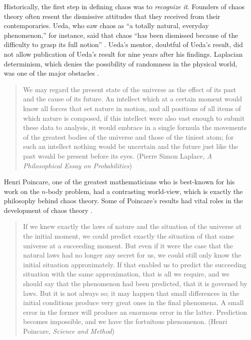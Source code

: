 \documentclass[10pt,twoside,draft]{book}
\begin{document}
Historically, the first step in defining chaos was to \textit{recognize it}.
Founders of chaos theory often resent the dismissive attitudes that they received from their contemporaries.
Ueda, who saw chaos as ``a totally natural, everyday phenomenon,'' for instance, said that chaos ``has been dismissed because of the difficulty to grasp its full notion'' \citep[p.533]{gleick}.
Ueda's mentor, doubtful of Ueda's result, did not allow publication of Ueda's result for nine years after his findings.
Laplacian determinism, which denies the possibility of randomness in the physical world, was one of the major obstacles \citep{stone}.
\begin{quotation}
  We may regard the present state of the universe as the effect of its past and the cause of its future. An intellect which at a certain moment would know all forces that set nature in motion, and all positions of all items of which nature is composed, if this intellect were also vast enough to submit these data to analysis, it would embrace in a single formula the movements of the greatest bodies of the universe and those of the tiniest atom; for such an intellect nothing would be uncertain and the future just like the past would be present before its eyes.
  (Pierre Simon Laplace, \textit{A Philosophical Essay on Probabilities})
\end{quotation}
Henri Poincare, one of the greatest mathematicians who is best-known for his work on the $n$-body problem, had a contrasting world-view, which is exactly the philosophy behind chaos theory.
Some of Poincare's results had vital roles in the development of chaos theory \citep[p.202]{ueda-abraham}.
\begin{quotation}
  If we knew exactly the laws of nature and the situation of the universe at the initial moment, we could predict exactly the situation of that same universe at a succeeding moment. But even if it were the case that the natural laws had no longer any secret for us, we could still only know the initial situation approximately. If that enabled us to predict the succeeding situation with the same approximation, that is all we require, and we should say that the phenomenon had been predicted, that it is governed by laws. But it is not always so; it may happen that small differences in the initial conditions produce very great ones in the final phenomena. A small error in the former will produce an enormous error in the latter. Prediction becomes impossible, and we have the fortuitous phenomenon.
  (Henri Poincare, \textit{Science and Method})
\end{quotation}
\end{document}
